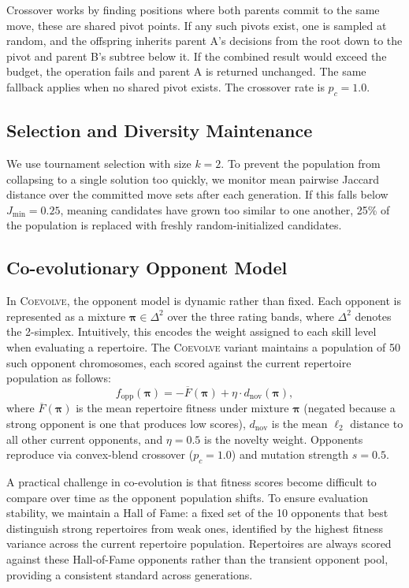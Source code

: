\documentclass[conference]{IEEEtran}
\begin{document}
Crossover works by finding positions where both parents commit to the same move, these are shared pivot points. If any such pivots exist,
one is sampled at random, and the offspring inherits parent A's decisions
from the root down to the pivot and parent B's subtree below it. If the
combined result would exceed the budget, the operation fails and parent A
is returned unchanged. The same fallback applies when no shared pivot exists.
The crossover rate is $p_c = 1.0$.

\subsection{Selection and Diversity Maintenance}

We use tournament selection with size $k = 2$. To prevent the population
from collapsing to a single solution too quickly, we monitor mean pairwise
Jaccard distance over the committed move sets after each generation. If
this falls below $J_{\min} = 0.25$, meaning candidates have grown too
similar to one another, 25\% of the population is replaced with freshly
random-initialized candidates.

\subsection{Co-evolutionary Opponent Model}

In \textsc{Coevolve}, the opponent model is dynamic rather than fixed. Each opponent is represented as a mixture $\boldsymbol{\pi} \in \Delta^2$ over the three rating bands, where $\Delta^2$ denotes the 2-simplex. Intuitively, this encodes the weight assigned to each skill level when evaluating a repertoire. The \textsc{Coevolve} variant maintains a population of 50 such opponent chromosomes, each scored against the current repertoire population as follows:
\begin{equation}
f_{\mathrm{opp}}(\boldsymbol{\pi}) = -\overline{F}(\boldsymbol{\pi}) + \eta \cdot d_{\text{nov}}(\boldsymbol{\pi}),
\label{eq:oppfit}
\end{equation}
where $\overline{F}(\boldsymbol{\pi})$ is the mean repertoire fitness under mixture $\boldsymbol{\pi}$ (negated because a strong opponent is one that produces low scores), $d_{\text{nov}}$ is the mean $\ell_2$ distance to all other current opponents, and $\eta = 0.5$ is the novelty weight. Opponents reproduce via convex-blend crossover ($p_c = 1.0$) and mutation strength $s = 0.5$.

A practical challenge in co-evolution is that fitness scores become difficult to compare over time as the opponent population shifts. To ensure evaluation stability, we maintain a Hall of Fame: a fixed set of the 10 opponents that best distinguish strong repertoires from weak ones, identified by the highest fitness variance across the current repertoire population. Repertoires are always scored against these Hall-of-Fame opponents rather than the transient opponent pool, providing a consistent standard across generations.
\end{document}
